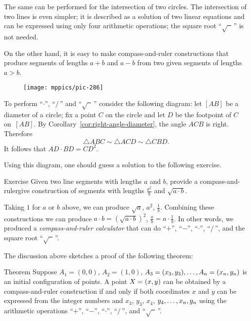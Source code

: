 The same can be performed for the intersection of two circles. 
The intersection of two lines is even simpler; 
it is described as a solution of two linear equations and can be expressed using only four arithmetic operations;
the square root ``$\sqrt{\phantom{a}}\,$'' is not needed.

\medskip

On the other hand, it is easy to make compass-and-ruler constructions that produce segments of lengths $a+b$ and $a-b$ from two given segments of lengths $a>b$.

\begin{wrapfigure}{r}{37mm}
\vskip-6mm
\centering
\texttt{[image: mppics/pic-286]}
\end{wrapfigure}

To perform ``$\cdot$'', ``$/\,$''
and ``$\sqrt{\phantom{a}}\,$'' consider the following diagram:
let $[AB]$ be a diameter of a circle; 
fix a point $C$ on the circle and let $D$ be the footpoint of $C$ on~$[AB]$.
By Corollary~\ref{cor:right-angle-diameter}, the angle $ACB$ is right.
Therefore 
$$\triangle ABC\sim\triangle ACD\sim \triangle CBD.$$
It follows that $AD\cdot BD=CD^2$. 

Using this diagram, one should guess a solution to the following exercise.

\begin{thm}{Exercise}\label{ex:a2/b}
Given two line segments with lengths $a$ and $b$, provide a compass-and-rulergive construction of segments with lengths $\tfrac {a^2}b$ and $\sqrt{a\cdot b}$.
\end{thm}


Taking $1$ for $a$ or $b$ above, we can produce 
$\sqrt a$, $a^2$, $\tfrac1b$.
Combining these constructions we can produce
$a\cdot b=(\sqrt{a\cdot b})^2$,
$\tfrac ab=a\cdot\tfrac 1b$.
In other words, we produced a \emph{compass-and-ruler calculator} that can do ``$+$'', ``$-$'', ``$\cdot$'', ``$/\,$'', and the square root ``$\sqrt{\phantom{a}}\,$''.

The discussion above sketches a proof of the following theorem:
 
\begin{thm}{Theorem}\label{thm:constructible-numbers}
Suppose $A_1=(0,0)$, $A_2=(1,0)$, $A_3=(x_3,y_3),\dots,A_n=(x_n,y_n)$ is 
an initial configuration of points.
A point $X=(x,y)$ can be obtained by a compass-and-ruler construction
if and only if both coordinates $x$ and $y$ can be expressed from the integer numbers and $x_3$, $y_3$, $x_4$, $y_4,\dots,x_n,y_n$ using the arithmetic operations ``$+$'', ``$-$'', ``$\cdot$'', ``$/\,$'', and ``$\sqrt{\phantom{a}}\,$''.
\end{thm}

